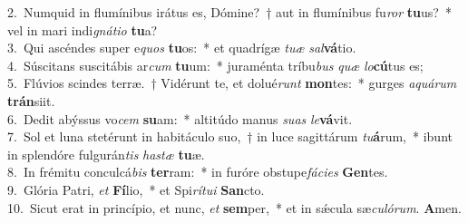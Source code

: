 {2.~}Numquid in flumínibus irátus es, Dómine?~† aut in flumínibus fu\textit{ror} \textbf{tu}us?~* vel in mari indi\textit{gná}\textit{ti}\textit{o} \textbf{tu}a?\\
{3.~}Qui ascéndes super e\textit{quos} \textbf{tu}os:~* et quadrígæ \textit{tu}\textit{æ} \textit{sal}\textbf{vá}tio.\\
{4.~}Súscitans suscitábis ar\textit{cum} \textbf{tu}um:~* juraménta tríbu\textit{bus} \textit{quæ} \textit{lo}\textbf{cú}tus es;\\
{5.~}Flúvios scindes terræ.~† Vidérunt te, et dolué\textit{runt} \textbf{mon}tes:~* gurges \textit{a}\textit{quá}\textit{rum} \textbf{trán}siit.\\
{6.~}Dedit abýssus vo\textit{cem} \textbf{su}am:~* altitúdo manus \textit{su}\textit{as} \textit{le}\textbf{vá}vit.\\
{7.~}Sol et luna stetérunt in habitáculo suo,~† in luce sagittárum \textit{tu}\textbf{á}rum,~* ibunt in splendóre fulgurán\textit{tis} \textit{ha}\textit{stæ} \textbf{tu}æ.\\
{8.~}In frémitu conculcá\textit{bis} \textbf{ter}ram:~* in furóre obstupe\textit{fá}\textit{ci}\textit{es} \textbf{Gen}tes.\\
{9.~}Glória Patri, \textit{et} \textbf{Fí}lio,~* et Spi\textit{rí}\textit{tu}\textit{i} \textbf{San}cto.\\
{10.~}Sicut erat in princípio, et nunc, \textit{et} \textbf{sem}per,~* et in sǽcula sæ\textit{cu}\textit{ló}\textit{rum}. \textbf{A}men.\\
